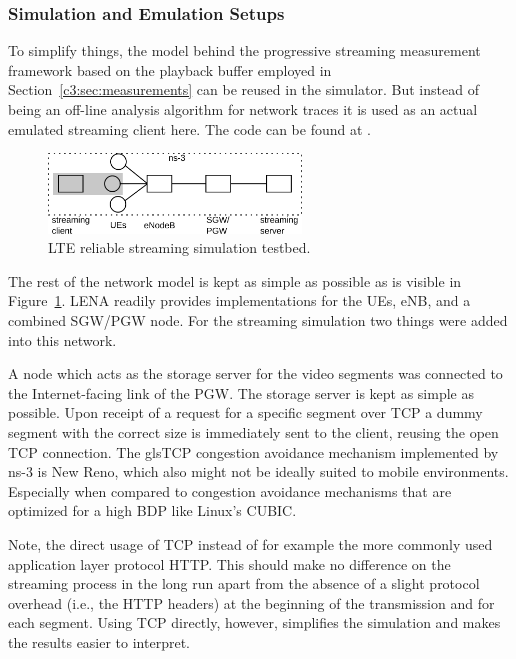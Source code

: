 \subsubsection{Simulation and Emulation Setups}

To simplify things, the model behind the progressive streaming measurement framework based on the playback buffer employed in Section~\ref{c3:sec:measurements} can be reused in the simulator. But instead of being an off-line analysis algorithm for network traces it is used as an actual emulated streaming client here. The code can be found at .

\begin{figure}[htb]
\centering
\includegraphics[width=0.6\textwidth]{images/streaming-simulation.pdf}
\caption{\gls{LTE} reliable streaming simulation testbed.}
\label{c5:fig:streaming-simulation}
\end{figure}

The rest of the network model is kept as simple as possible as is visible in Figure~\ref{c5:fig:streaming-simulation}. LENA readily provides implementations for the \glspl{UE}, \gls{eNB}, and a combined \gls{SGW}/\gls{PGW} node. For the streaming simulation two things were added into this network. 

A node which acts as the storage server for the video segments was connected to the Internet-facing link of the \gls{PGW}. The storage server is kept as simple as possible. Upon receipt of a request for a specific segment over \gls{TCP} a dummy segment with the correct size is immediately sent to the client, reusing the open \gls{TCP} connection. 
The gls{TCP} congestion avoidance mechanism implemented by ns-3 is New Reno, which also might not be ideally suited to mobile environments. Especially when compared to congestion avoidance mechanisms that are optimized for a high \gls{BDP} like Linux's CUBIC.

Note, the direct usage of \gls{TCP} instead of for example the more commonly used application layer protocol \gls{HTTP}. This should make no difference on the streaming process in the long run apart from the absence of a slight protocol overhead (i.e., the \gls{HTTP} headers) at the beginning of the transmission and for each segment. Using \gls{TCP} directly, however, simplifies the simulation and makes the results easier to interpret.

